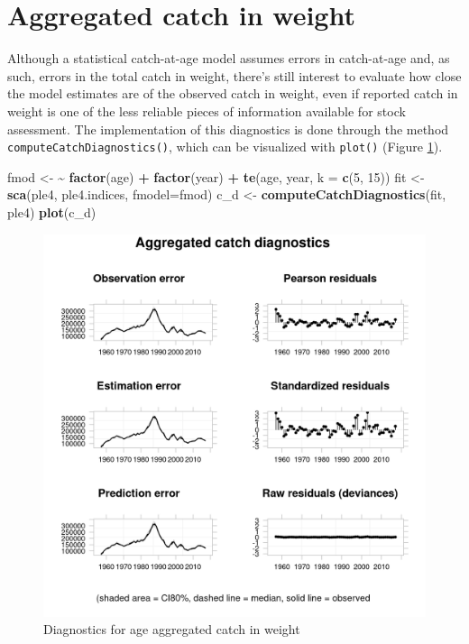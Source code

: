 \documentclass[
]{book}
\newenvironment{Shaded}{\begin{snugshade}}{\end{snugshade}}
\newcommand{\AttributeTok}[1]{\textcolor[rgb]{0.13,0.29,0.53}{#1}}
\newcommand{\DecValTok}[1]{\textcolor[rgb]{0.00,0.00,0.81}{#1}}
\newcommand{\ErrorTok}[1]{\textcolor[rgb]{0.64,0.00,0.00}{\textbf{#1}}}
\newcommand{\FunctionTok}[1]{\textcolor[rgb]{0.13,0.29,0.53}{\textbf{#1}}}
\newcommand{\NormalTok}[1]{#1}
\newcommand{\OtherTok}[1]{\textcolor[rgb]{0.56,0.35,0.01}{#1}}
\newcommand{\SpecialCharTok}[1]{\textcolor[rgb]{0.81,0.36,0.00}{\textbf{#1}}}
\begin{document}
\hypertarget{aggregated-catch-in-weight}{%
\section{Aggregated catch in weight}\label{aggregated-catch-in-weight}}

Although a statistical catch-at-age model assumes errors in catch-at-age and, as such, errors in the total catch in weight, there's still interest to evaluate how close the model estimates are of the observed catch in weight, even if reported catch in weight is one of the less reliable pieces of information available for stock assessment. The implementation of this diagnostics is done through the method \texttt{computeCatchDiagnostics()}, which can be visualized with \texttt{plot()} (Figure \ref{fig:catchdiag}).

\begin{Shaded}
\begin{Highlighting}[]
\NormalTok{fmod }\OtherTok{\textless{}{-}} \ErrorTok{\textasciitilde{}} \FunctionTok{factor}\NormalTok{(age) }\SpecialCharTok{+} \FunctionTok{factor}\NormalTok{(year) }\SpecialCharTok{+} \FunctionTok{te}\NormalTok{(age, year, }\AttributeTok{k =} \FunctionTok{c}\NormalTok{(}\DecValTok{5}\NormalTok{, }\DecValTok{15}\NormalTok{))}
\NormalTok{fit }\OtherTok{\textless{}{-}} \FunctionTok{sca}\NormalTok{(ple4, ple4.indices, }\AttributeTok{fmodel=}\NormalTok{fmod)}
\NormalTok{c\_d }\OtherTok{\textless{}{-}} \FunctionTok{computeCatchDiagnostics}\NormalTok{(fit, ple4)}
\FunctionTok{plot}\NormalTok{(c\_d)}
\end{Highlighting}
\end{Shaded}

\begin{figure}
\includegraphics[width=1\linewidth]{_bookdown_files/_main_files/figure-html/catchdiag-1} \caption{Diagnostics for age aggregated catch in weight}\label{fig:catchdiag}
\end{figure}
\end{document}
